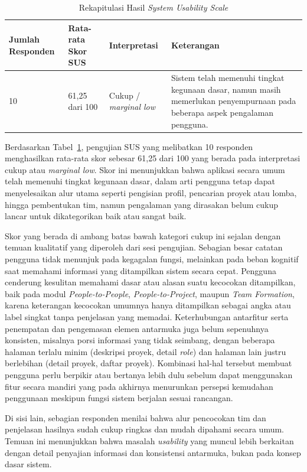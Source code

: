 \begin{table}[H]
  \caption{Rekapitulasi Hasil \emph{System Usability Scale}}
  \label{tab:hasil-sus}
  \begin{tabularx}{\textwidth}{p{2cm} p{3cm} p{2.5cm} X}
    \toprule
    \textbf{Jumlah Responden} & \textbf{Rata-rata Skor SUS} & \textbf{Interpretasi} & \textbf{Keterangan} \\
    \midrule
    10 & 61{,}25 dari 100 & Cukup / \emph{marginal low} & Sistem telah memenuhi tingkat kegunaan dasar, namun masih memerlukan penyempurnaan pada beberapa aspek pengalaman pengguna. \\
    \bottomrule
  \end{tabularx}
\end{table}

Berdasarkan Tabel~\ref{tab:hasil-sus}, pengujian SUS yang melibatkan 10 responden menghasilkan rata-rata skor sebesar 61{,}25 dari 100 yang berada pada interpretasi cukup atau \emph{marginal low}. Skor ini menunjukkan bahwa aplikasi secara umum telah memenuhi tingkat kegunaan dasar, dalam arti pengguna tetap dapat menyelesaikan alur utama seperti pengisian profil, pencarian proyek atau lomba, hingga pembentukan tim, namun pengalaman yang dirasakan belum cukup lancar untuk dikategorikan baik atau sangat baik.

Skor yang berada di ambang batas bawah kategori cukup ini sejalan dengan temuan kualitatif yang diperoleh dari sesi pengujian. Sebagian besar catatan pengguna tidak menunjuk pada kegagalan fungsi, melainkan pada beban kognitif saat memahami informasi yang ditampilkan sistem secara cepat. Pengguna cenderung kesulitan memahami dasar atau alasan suatu kecocokan ditampilkan, baik pada modul \emph{People-to-People}, \emph{People-to-Project}, maupun \emph{Team Formation}, karena keterangan kecocokan umumnya hanya ditampilkan sebagai angka atau label singkat tanpa penjelasan yang memadai. Keterhubungan antarfitur serta penempatan dan pengemasan elemen antarmuka juga belum sepenuhnya konsisten, misalnya porsi informasi yang tidak seimbang, dengan beberapa halaman terlalu minim (deskripsi proyek, detail \emph{role}) dan halaman lain justru berlebihan (detail proyek, daftar proyek). Kombinasi hal-hal tersebut membuat pengguna perlu berpikir atau bertanya lebih dulu sebelum dapat menggunakan fitur secara mandiri yang pada akhirnya menurunkan persepsi kemudahan penggunaan meskipun fungsi sistem berjalan sesuai rancangan.

Di sisi lain, sebagian responden menilai bahwa alur pencocokan tim dan penjelasan hasilnya sudah cukup ringkas dan mudah dipahami secara umum. Temuan ini menunjukkan bahwa masalah \emph{usability} yang muncul lebih berkaitan dengan detail penyajian informasi dan konsistensi antarmuka, bukan pada konsep dasar sistem.

